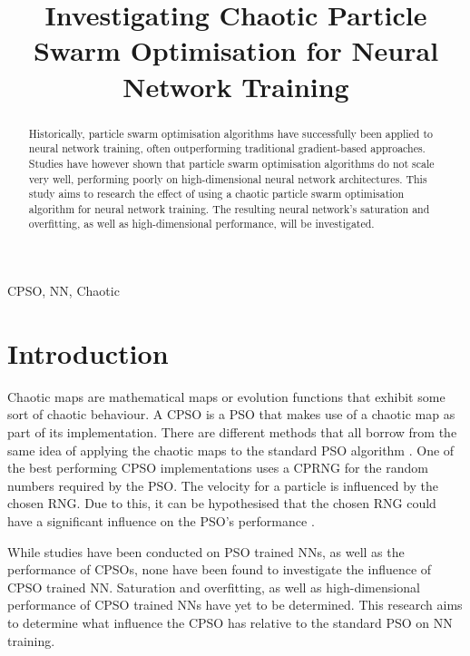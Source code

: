 \documentclass[conference]{IEEEtran}
\begin{document}
\title{Investigating Chaotic Particle Swarm Optimisation for Neural Network Training\\
}

\author{
}

\maketitle

\begin{abstract}
Historically, particle swarm optimisation algorithms have successfully been applied to neural network training, often outperforming traditional gradient-based approaches. Studies have however shown that particle swarm optimisation algorithms do not scale very well, performing poorly on high-dimensional neural network architectures. This study aims to research the effect of using a chaotic particle swarm optimisation algorithm for neural network training. The resulting neural network's saturation and overfitting, as well as high-dimensional performance, will be investigated.
\end{abstract}

\begin{IEEEkeywords}
CPSO, NN, Chaotic
\end{IEEEkeywords}

\section{Introduction}
Chaotic maps are mathematical maps or evolution functions that exhibit some sort of chaotic behaviour. A \ac{CPSO} is a \ac{PSO} that makes use of a chaotic map as part of its implementation. There are different methods that all borrow from the same idea of applying the chaotic maps to the standard \ac{PSO} algorithm  \cite{pluhacek:cpso-iw}\cite{pluhacek:cpso-cprng-imp}. One of the best performing \ac{CPSO} implementations uses a \ac{CPRNG} for the random numbers required by the \ac{PSO}. The velocity for a particle is influenced by the chosen \ac{RNG}. Due to this, it can be hypothesised that the chosen \ac{RNG} could have a significant influence on the \ac{PSO}'s performance \cite{pluhacek:cpso-cprng-imp}.

While studies have been conducted on \ac{PSO} trained \ac{NN}s, as well as the performance of \ac{CPSO}s, none have been found to investigate the influence of \ac{CPSO} trained \ac{NN}. Saturation and overfitting, as well as high-dimensional performance of \ac{CPSO} trained \ac{NN}s have yet to be determined. This research aims to determine what influence the \ac{CPSO} has relative to the standard \ac{PSO} on \ac{NN} training.
\end{document}
